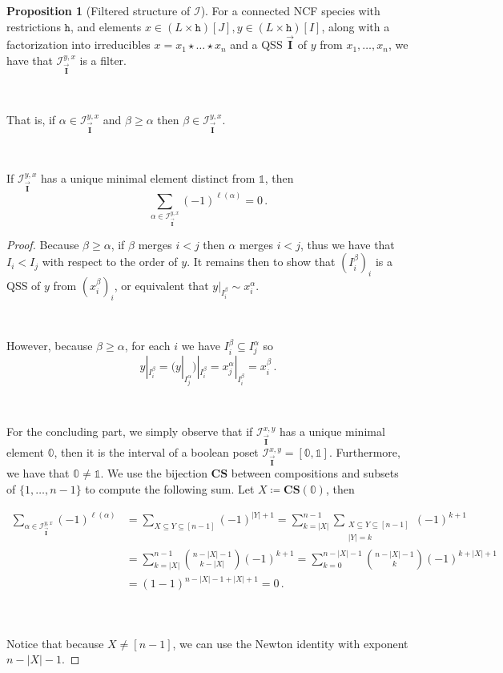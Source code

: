\documentclass[12pt, reqno]{amsart}
\theoremstyle{definition}
\newtheorem{prop}[thm]{Proposition}
\newcommand{\III}{\vec{\mathbf{I}}}
\begin{document}
\begin{prop}[Filtered structure of $\mathcal I$]\label{prop:filter_structure_I}
For a connected NCF species with restrictions $\mathtt{h}$, and elements $x\in (L\times \mathtt{h})[J], y\in (L\times \mathtt{h})[I]$, along with a factorization into irreducibles $x = x_1 \star \dots \star x_n$ and a QSS $\III$ of $y$ from $x_1, \dots, x_n$, we have that $\mathcal I^{y, x}_{\III}$ is a filter.

\

That is, if $\alpha \in \mathcal I^{y, x}_{\III}$ and $\beta \geq \alpha$ then $\beta \in \mathcal I^{y, x}_{\III}$.

\

If $\mathcal I^{y, x}_{\III}$ has a unique minimal element distinct from $\mathbb{1}$, then
$$\sum_{\alpha \in \mathcal I^{y, x}_{\III}} (-1)^{\ell(\alpha)} = 0 \, .$$
\end{prop}

\begin{proof}
Because $\beta \geq \alpha$, if $\beta $ merges $i < j$ then $\alpha $ merges $i < j$, thus we have that $I_i < I_j$ with respect to the order of $y$.
It remains then to show that $(I^{\beta}_i)_i$ is a QSS of $y$ from $(x^{\beta}_i )_i$, or equivalent that $y|_{I_i^{\beta}} \sim x_i^{\alpha}$.

\

However, because $\beta \geq \alpha$, for each $i$ we have $I^{\beta}_i \subseteq I^{\alpha}_j$ so 
\[y|_{I^{\beta}_i} = {\Big(}y|_{I^{\alpha}_j}{\Big )}|_{I^{\beta}_i} =x^{\alpha}_j |_{I^{\beta}_i} = x^{\beta}_i \, .\]

\

For the concluding part, we simply observe that if $\mathcal I^{x, y}_{\III}$ has a unique minimal element $\mathbb{0}$, then it is the interval of a boolean poset $\mathcal I^{x, y}_{\III} = [\mathbb{0}, \mathbb{1}]$.
Furthermore, we have that $\mathbb{0} \neq \mathbb{1}$.
We use the bijection $\mathbf{CS}$ between compositions and subsets of $\{1, \dots , n-1\}$ to compute the following sum.
Let $X \coloneqq \mathbf{CS}(\mathbb{0} )$, then 

\begin{align*}
\sum_{\alpha \in \mathcal I^{y, x}_{\III}} (-1)^{\ell(\alpha)} &= \sum_{X \subseteq Y \subseteq [n-1]} (-1)^{|Y| +1} = \sum_{k = |X|}^{n-1} \sum_{\substack{X \subseteq Y \subseteq [n-1]\\ |Y| = k}} (-1)^{k +1} \\
&= \sum_{k = |X|}^{n-1}\binom{n-|X| - 1}{k - |X|} (-1)^{k +1} = \sum_{k = 0}^{n- |X|-1}\binom{n-|X| - 1}{k} (-1)^{k + |X| +1}  \\
&= (1 -1)^{n - |X| - 1 + |X| +1} = 0 \, .\\
\end{align*}

\

Notice that because $X \neq [n-1]$, we can use the Newton identity with exponent $n-|X| - 1$.
\end{proof}
\end{document}
